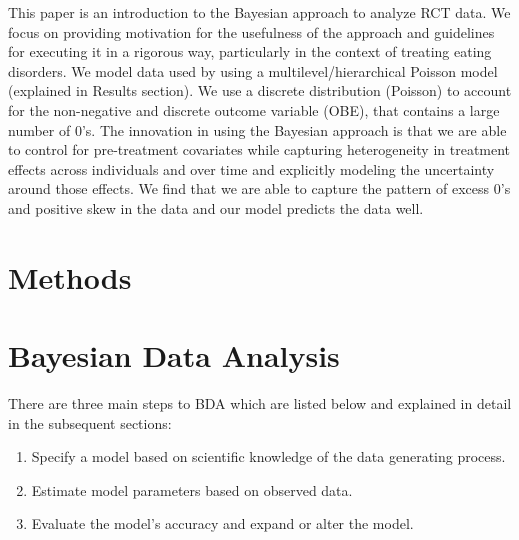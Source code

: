 \documentclass{article}
\begin{document}
This paper is an introduction to the Bayesian approach to analyze RCT data. We focus on providing motivation for the usefulness of the approach and guidelines for executing it in a rigorous way, particularly in the context of treating eating disorders. We model data used by  using a multilevel/hierarchical Poisson model (explained in Results section). We use a discrete distribution (Poisson) to account for the non-negative and discrete outcome variable (OBE), that contains a large number of 0's. The innovation in using the Bayesian approach is that we are able to control for pre-treatment covariates while capturing heterogeneity in treatment effects across individuals and over time and explicitly modeling the uncertainty around those effects.  We find that we are able to capture the pattern of excess 0's and positive skew in the data and our model predicts the data well. \\

\section{Methods}
\section*{Bayesian Data Analysis}
There are three main steps to BDA which are listed below and explained in detail in the subsequent sections:
\begin{enumerate}
\item Specify a model based on scientific knowledge of the data generating process.
\item Estimate model parameters based on observed data.
\item Evaluate the model's accuracy and expand or alter the model.
\end{enumerate}
\end{document}
